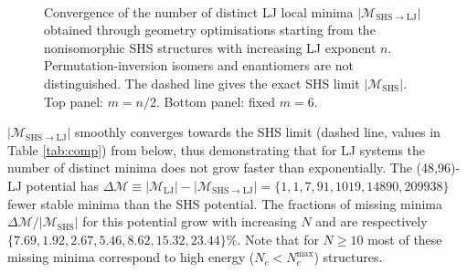\begin{figure}
    \centering
    \\
    \caption{
    Convergence of the number of distinct LJ local minima
 $|\mathcal{M}_\mathrm{SHS\to LJ}|$
     obtained through geometry optimisations starting from the nonisomorphic SHS structures with
     increasing LJ exponent $n$. 
Permutation-inversion isomers and enantiomers are not distinguished.     
     The dashed line gives the exact SHS limit $|\mathcal{M}_\mathrm{SHS}|$. 
     Top panel: $m=n/2$. Bottom panel: fixed $m=6$.}
    \label{fig:expinfty}
\end{figure}

$|\mathcal{M}_\mathrm{SHS\to LJ}|$ smoothly  converges towards the SHS limit (dashed line, values in Table \ref{tab:comp}) from below, 
thus demonstrating that for LJ systems the number of distinct minima does not grow faster than exponentially.  
The (48,96)-LJ potential has $\Delta\mathcal{M} \equiv |\mathcal{M}_\mathrm{LJ}| - |\mathcal{M}_\mathrm{SHS\to LJ}| = \{1,1,7,91,1019,14890,209938\}$ fewer stable minima than the SHS potential.
The fractions of missing minima $\Delta\mathcal{M}/|\mathcal{M}_\mathrm{SHS}|$ for this potential grow with increasing $N$ and are respectively $\{7.69,1.92,2.67,5.46,8.62,15.32,23.44\}\%$.  Note that for $N \geq 10$ most of these missing minima correspond to high energy ($N_c < N_c^\mathrm{max}$) structures.


